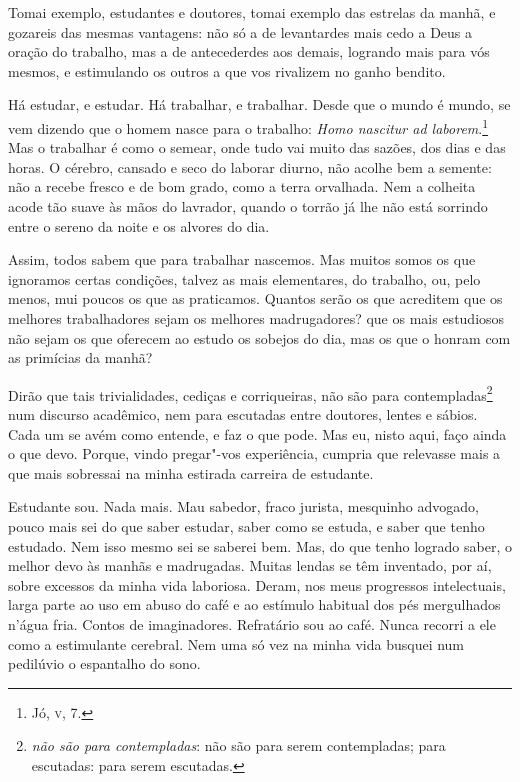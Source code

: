 Tomai exemplo, estudantes e doutores, tomai exemplo das estrelas
da manhã, e gozareis das mesmas vantagens: não só a de levantardes mais
cedo a Deus a oração do trabalho, mas a de antecederdes aos demais,
logrando mais para vós mesmos, e estimulando os outros a que vos
rivalizem no ganho bendito.

Há estudar, e estudar. Há trabalhar, e trabalhar. Desde que o
mundo é mundo, se vem dizendo que o homem nasce para o trabalho:
\textit{Homo nascitur ad laborem}.\footnote{ Jó, \textsc{v}, 7.} 
Mas o trabalhar é como o semear, onde tudo vai muito das sazões,
dos dias e das horas. O cérebro, cansado e seco do laborar diurno, não
acolhe bem a semente: não a recebe fresco e de bom grado, como a terra
orvalhada. Nem a colheita acode tão suave às mãos do lavrador, quando o
torrão já lhe não está sorrindo entre o sereno da noite e os alvores do dia.

Assim, todos sabem que para trabalhar nascemos. Mas muitos somos
os que ignoramos certas condições, talvez as mais elementares, do
trabalho, ou, pelo menos, mui poucos os que as praticamos. Quantos
serão os que acreditem que os melhores trabalhadores sejam os melhores
madrugadores? que os mais estudiosos não sejam os que oferecem ao
estudo os sobejos do dia, mas os que o honram com as primícias da
manhã?

Dirão que tais trivialidades, cediças e corriqueiras, não são para
contempladas\footnote{ \textit{não são para contempladas}: 
não são para serem contempladas; para escutadas: para serem escutadas.} num discurso
acadêmico, nem para escutadas entre doutores, lentes e sábios. Cada um
se avém como entende, e faz o que pode. Mas eu, nisto aqui, faço ainda
o que devo. Porque, vindo pregar"-vos experiência, cumpria que relevasse
mais a que mais sobressai na minha estirada carreira de estudante.

Estudante sou. Nada mais. Mau sabedor, fraco jurista, mesquinho
advogado, pouco mais sei do que saber estudar, saber como se estuda, e
saber que tenho estudado. Nem isso mesmo sei se saberei bem. Mas, do
que tenho logrado saber, o melhor devo às manhãs e madrugadas. Muitas
lendas se têm inventado, por aí, sobre excessos da minha vida
laboriosa. Deram, nos meus progressos intelectuais, larga parte ao uso
em abuso do café e ao estímulo habitual dos pés mergulhados
n'água fria. Contos de imaginadores. Refratário sou ao
café. Nunca recorri a ele como a estimulante cerebral. Nem uma só vez
na minha vida busquei num pedilúvio o espantalho do sono.

